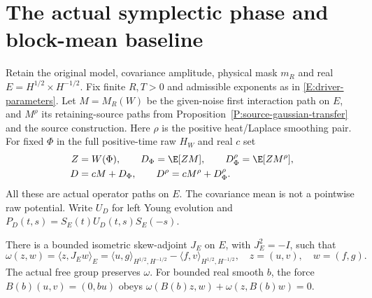 \section{The actual symplectic phase and block-mean baseline}
\label{S:actual-symplectic-phase}

Retain the original model, covariance amplitude, physical mask $m_R$
and real $E=H^{1/2}\times H^{-1/2}$.
Fix finite $R,T>0$ and admissible exponents as in
\eqref{E:driver-parameters}.
Let $M=M_R(W)$ be the given-noise first interaction path on $E$,
and $M^\rho$ its retaining-source paths from
Proposition~\ref{P:source-gaussian-transfer} and the source construction.
Here $\rho$ is the positive heat/Laplace smoothing pair.
For fixed $\Phi$ in the full positive-time raw $H_W$ and real $c$ set
\begin{equation}\label{E:symplectic-combined-driver}
  \begin{aligned}
    Z&=W(\Phi),\qquad D_\Phi=\E[ZM],\qquad
    D_\Phi^\rho=\E[ZM^\rho],\\
    D&=cM+D_\Phi,\qquad D^\rho=cM^\rho+D_\Phi^\rho .
  \end{aligned}
\end{equation}
All these are actual operator paths on $E$.
The covariance mean is not a pointwise raw potential.
Write $U_D$ for left Young evolution and
$P_D(t,s)=S_E(t)U_D(t,s)S_E(-s)$.

\begin{lemma}
  \label{L:symplectic-free}
  There is a bounded isometric skew-adjoint $J_E$ on $E$,
  with $J_E^2=-I$, such that
  \[
    \omega(z,w)=\langle z,J_Ew\rangle_E
    =\langle u,g\rangle_{H^{1/2},H^{-1/2}}
    -\langle f,v\rangle_{H^{1/2},H^{-1/2}},
    \quad z=(u,v),\quad w=(f,g).
  \]
  The actual free group preserves $\omega$.
  For bounded real smooth $b$, the force $B(b)(u,v)=(0,bu)$
  obeys $\omega(B(b)z,w)+\omega(z,B(b)w)=0$.
\end{lemma}

